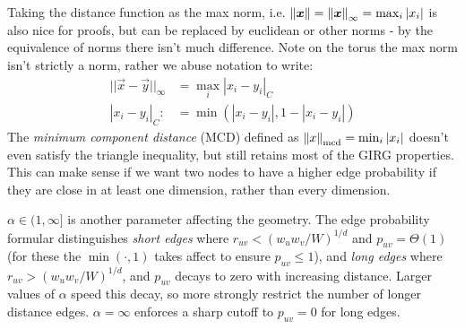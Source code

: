
Taking the distance function as the max norm, i.e. $\left\lVert \bm{x}\right\rVert = \left\lVert \bm{x}\right\rVert_\infty = \max_i |x_i|$ is also nice for proofs, but can be replaced by euclidean or other norms - by the equivalence of norms there isn't much difference. Note on the torus the max norm isn't strictly a norm, rather we abuse notation to write:
\begin{align}
    ||\vec{x} - \vec{y}||_\infty &= \max_i |x_i - y_i|_C\\
     |x_i - y_i|_C :&= \min(|x_i - y_i|, 1 - |x_i - y_i|)
\end{align}
The \textit{minimum component distance} (MCD) defined as $\left\lVert x\right\rVert_{\mathrm{mcd}} = \min_i |x_i|$ doesn't even satisfy the triangle inequality, but still retains most of the GIRG properties. This can make sense if we want two nodes to have a higher edge probability if they are close in at least one dimension, rather than every dimension.

$\alpha \in (1, \infty]$ is another parameter affecting the geometry. The edge probability formular distinguishes \textit{short edges} where $r_{uv} < (w_u w_v / W)^{1/d}$ and $p_{uv} = \Theta(1)$ (for these the $\min(\cdot, 1)$ takes affect to ensure $p_{uv} \leq 1$), and \textit{long edges} where $r_{uv} > (w_u w_v / W)^{1/d}$, and $p_{uv}$ decays to zero with increasing distance. Larger values of $\alpha$ speed this decay, so more strongly restrict the number of longer distance edges. $\alpha=\infty$ enforces a sharp cutoff to $p_{uv} = 0$ for long edges.


